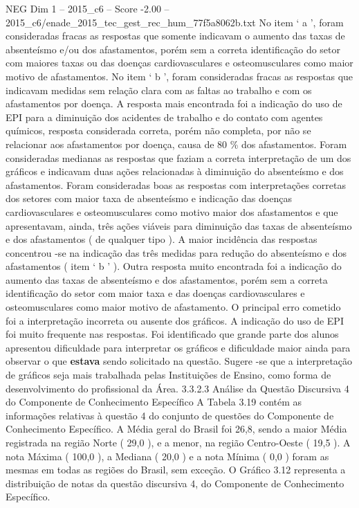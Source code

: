 \begin{textsample}{NEG Dim 1 – 2015\_c6 – Score -2.00 – 2015\_c6/enade\_2015\_tec\_gest\_rec\_hum\_77f5a8062b.txt}
No item ‘ a ’, foram consideradas fracas as respostas que somente indicavam o aumento das taxas de absenteísmo e/ou dos afastamentos, porém sem a correta identificação do setor com maiores taxas ou das doenças cardiovasculares e osteomusculares como maior motivo de afastamentos.
No item ‘ b ’, foram consideradas fracas as respostas que indicavam medidas sem relação clara com as faltas ao trabalho e com os afastamentos por doença.
A resposta mais encontrada foi a indicação do uso de EPI para a diminuição dos acidentes de trabalho e do contato com agentes químicos, resposta considerada correta, porém não completa, por não se relacionar aos afastamentos por doença, causa de 80 \% dos afastamentos.
Foram consideradas medianas as respostas que faziam a correta interpretação de um dos gráficos e indicavam duas ações relacionadas à diminuição do absenteísmo e dos afastamentos.
Foram consideradas boas as respostas com interpretações corretas dos setores com maior taxa de absenteísmo e indicação das doenças cardiovasculares e osteomusculares como motivo maior dos afastamentos e que apresentavam, ainda, três ações viáveis para diminuição das taxas de absenteísmo e dos afastamentos ( de qualquer tipo ).
A maior incidência das respostas concentrou -se na indicação das três medidas para redução do absenteísmo e dos afastamentos ( item ‘ b ’ ).
Outra resposta muito encontrada foi a indicação do aumento das taxas de absenteísmo e dos afastamentos, porém sem a correta identificação do setor com maior taxa e das doenças cardiovasculares e osteomusculares como maior motivo de afastamento.
O principal erro cometido foi a interpretação incorreta ou ausente dos gráficos.
A indicação do uso de EPI foi muito frequente nas respostas.
Foi identificado que grande parte dos alunos apresentou dificuldade para interpretar os gráficos e dificuldade maior ainda para observar o que \textbf{estava} sendo solicitado na questão.
Sugere -se que a interpretação de gráficos seja mais trabalhada pelas Instituições de Ensino, como forma de desenvolvimento do profissional da Área. 3.3.2.3 Análise da Questão Discursiva 4 do Componente de Conhecimento Específico A Tabela 3.19 contém as informações relativas à questão 4 do conjunto de questões do Componente de Conhecimento Específico.
A Média geral do Brasil foi 26,8, sendo a maior Média registrada na região Norte ( 29,0 ), e a menor, na região Centro-Oeste ( 19,5 ).
A nota Máxima ( 100,0 ), a Mediana ( 20,0 ) e a nota Mínima ( 0,0 ) foram as mesmas em todas as regiões do Brasil, sem exceção.
O Gráfico 3.12 representa a distribuição de notas da questão discursiva 4, do Componente de Conhecimento Específico.

\end{textsample}
